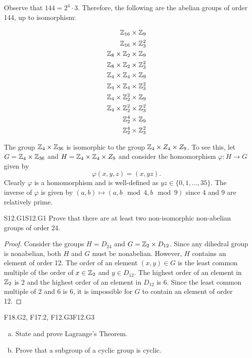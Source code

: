 \documentclass[../AlgebraQualSolutions.tex]{subfiles}
\begin{document}
\begin{solution}
Observe that $144 = 2^4 \cdot 3$. Therefore, the following are the abelian groups of order 144, up to isomorphism:

\begin{align*}
	\mathbb{Z}_{16} \times \mathbb{Z}_9 \\
	\mathbb{Z}_{16} \times \mathbb{Z}_3^2 \\
	\mathbb{Z}_8 \times \mathbb{Z}_2 \times \mathbb{Z}_9 \\
	\mathbb{Z}_8 \times \mathbb{Z}_2 \times \mathbb{Z}_3^2\\
	\mathbb{Z}_4 \times \mathbb{Z}_4 \times \mathbb{Z}_9 \\
	\mathbb{Z}_4 \times \mathbb{Z}_4 \times \mathbb{Z}_3^2\\
	\mathbb{Z}_4 \times \mathbb{Z}_2^2 \times \mathbb{Z}_9 \\
	\mathbb{Z}_4 \times \mathbb{Z}_2^2 \times \mathbb{Z}_3^2 \\
	\mathbb{Z}_2^4 \times \mathbb{Z}_9 \\
	\mathbb{Z}_2^4 \times \mathbb{Z}_3^2 \\
\end{align*}

The group $\mathbb{Z}_4 \times \mathbb{Z}_{36}$ is isomorphic to the group $\mathbb{Z}_4 \times Z_4 \times Z_9$. To see this, let $G = \mathbb{Z}_4 \times \mathbb{Z}_{36}$ and $H = \mathbb{Z}_4 \times \mathbb{Z}_{4} \times Z_9$ and consider the homomorphism $\varphi: H \to G$ given by
	\[\varphi(x,y,z) = (x,yz). \]
Clearly $\varphi$ is a homomorphism and is well-defined as $yz \in \{0,1, \ldots, 35\}$. The inverse of $\varphi$ is given by $(a,b) \mapsto(a,b\mod{4},b\mod{9})$ since 4 and 9 are relatively prime.
\end{solution}

\begin{prob}{S12.G1}{S12.G1}
	Prove that there are at least two non-isomorphic non-abelian groups of order 24.
\end{prob}

\begin{proof}
	Consider the groups $H = D_{24}$ and $G = \mathbb{Z}_2 \times D_{12}$. Since any dihedral group is nonabelian, both $H$ and $G$ must be nonabelian. However, $H$ contains an element of order 12. The order of an element $(x,y) \in G$ is the least common multiple of the order of $x \in \mathbb{Z}_2$ and $y \in D_{12}$. The highest order of an element in $\mathbb{Z}_2$ is 2 and the highest order of an element in $D_{12}$ is 6. Since the least common multiple of 2 and 6 is 6, it is impossible for $G$ to contain an element of order 12.
\end{proof}

	\begin{prob}{F18.G2, F17.2, F12.G3}{F12.G3}
	\begin{enumerate}[(a)]
	\item State and prove Lagrange's Theorem.
	\item Prove that a subgroup of a cyclic group is cyclic.
	\end{enumerate}
	\end{prob}
	
\end{document}
